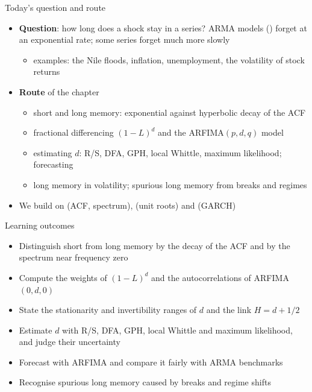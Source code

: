 \begin{frame}{Today's question and route}
\itemsize{\small}
\begin{itemize}
    \item \textbf{Question}: how long does a shock stay in a series? ARMA models () forget at an exponential rate; some series forget much more slowly
    \begin{itemize}
        \item examples: the Nile floods, inflation, unemployment, the volatility of stock returns
    \end{itemize}
    \item \textbf{Route} of the chapter
    \begin{itemize}
        \item short and long memory: exponential against hyperbolic decay of the ACF
        \item fractional differencing $(1-L)^d$ and the ARFIMA$(p,d,q)$ model
        \item estimating $d$: R/S, DFA, GPH, local Whittle, maximum likelihood; forecasting
        \item long memory in volatility; spurious long memory from breaks and regimes
    \end{itemize}
    \item We build on  (ACF, spectrum),  (unit roots) and  (GARCH)
\end{itemize}
\end{frame}

\begin{frame}{Learning outcomes}
\itemsize{\small}
\begin{itemize}
    \item Distinguish short from long memory by the decay of the ACF and by the spectrum near frequency zero
    \item Compute the weights of $(1-L)^d$ and the autocorrelations of ARFIMA$(0,d,0)$
    \item State the stationarity and invertibility ranges of $d$ and the link $H = d + 1/2$
    \item Estimate $d$ with R/S, DFA, GPH, local Whittle and maximum likelihood, and judge their uncertainty
    \item Forecast with ARFIMA and compare it fairly with ARMA benchmarks
    \item Recognise spurious long memory caused by breaks and regime shifts
\end{itemize}
\end{frame}

